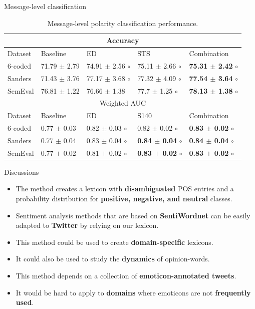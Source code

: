 \documentclass[handout]{beamer}
\begin{document}
\begin{frame}{Message-level classification}
\scriptsize
\begin{table}[htbp]
\begin{center}
\begin{tabular}{l|l|l|l|l}
\hline \hline
\multicolumn{ 5}{c}{Accuracy } \\ \hline \hline
Dataset & Baseline & ED & STS & Combination \\ \hline
6-coded & 71.79 $\pm$ 2.79 & 74.91 $\pm$ 2.56 $\circ$ & 75.11 $\pm$ 2.66 $\circ$ &  \textbf{75.31 $\pm$ 2.42} $\circ$ \\ 
Sanders & 71.43 $\pm$ 3.76 & 77.17 $\pm$ 3.68 $\circ$ & 77.32 $\pm$ 4.09 $\circ$ &  \textbf{77.54 $\pm$ 3.64} $\circ$ \\ 
SemEval & 76.81 $\pm$ 1.22 & 76.66 $\pm$ 1.38 & 77.7 $\pm$ 1.25 $\circ$ & \textbf{78.13 $\pm$ 1.38} $\circ$ \\ \hline \hline
\multicolumn{ 5}{c}{Weighted AUC } \\ \hline \hline
Dataset & Baseline & ED & S140 & Combination \\ \hline
6-coded & 0.77 $\pm$ 0.03 & 0.82 $\pm$ 0.03 $\circ$ & 0.82 $\pm$ 0.02 $\circ$ &  \textbf{0.83 $\pm$ 0.02} $\circ$ \\ 
Sanders & 0.77 $\pm$ 0.04 & 0.83 $\pm$ 0.04 $\circ$ & \textbf{0.84 $\pm$ 0.04} $\circ$  & \textbf{0.84 $\pm$ 0.04} $\circ$ \\ 
SemEval & 0.77 $\pm$ 0.02 & 0.81 $\pm$ 0.02 $\circ$ & \textbf{0.83 $\pm$ 0.02} $\circ$ &  \textbf{0.83 $\pm$ 0.02} $\circ$ \\ \hline
\end{tabular}
\caption{Message-level polarity classification performance.}
\label{tab:messclass}
\end{center}
\end{table}
\end{frame}


\begin{frame}{Discussions}
\begin{scriptsize}
\begin{itemize}
\item The method creates a lexicon with \textbf{disambiguated} POS entries and a probability distribution for \textbf{positive, negative, and neutral} classes. 
\item Sentiment analysis methods that are based on \textbf{SentiWordnet} can be easily adapted to \textbf{Twitter} by relying on our lexicon.
\item This method could be used to create \textbf{domain-specific} lexicons.
\item It could also be used to study the \textbf{dynamics} of opinion-words.
\item This method depends on a collection of \textbf{emoticon-annotated tweets}.
\item It would be hard to apply to \textbf{domains} where emoticons are not \textbf{frequently used}.

\end{itemize}
\end{scriptsize}

\end{frame}
\end{document}
